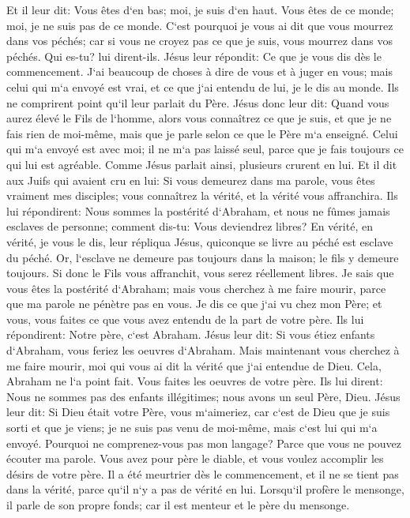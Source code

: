 \verse Et il leur dit: Vous êtes d`en bas; moi, je suis d`en haut. Vous êtes de ce monde; moi, je ne suis pas de ce monde. 
\verse C`est pourquoi je vous ai dit que vous mourrez dans vos péchés; car si vous ne croyez pas ce que je suis, vous mourrez dans vos péchés. 
\verse Qui es-tu? lui dirent-ils. Jésus leur répondit: Ce que je vous dis dès le commencement. 
\verse J`ai beaucoup de choses à dire de vous et à juger en vous; mais celui qui m`a envoyé est vrai, et ce que j`ai entendu de lui, je le dis au monde. 
\verse Ils ne comprirent point qu`il leur parlait du Père. 
\verse Jésus donc leur dit: Quand vous aurez élevé le Fils de l`homme, alors vous connaîtrez ce que je suis, et que je ne fais rien de moi-même, mais que je parle selon ce que le Père m`a enseigné. 
\verse Celui qui m`a envoyé est avec moi; il ne m`a pas laissé seul, parce que je fais toujours ce qui lui est agréable. 
\verse Comme Jésus parlait ainsi, plusieurs crurent en lui. 
\verse Et il dit aux Juifs qui avaient cru en lui: Si vous demeurez dans ma parole, vous êtes vraiment mes disciples; 
\verse vous connaîtrez la vérité, et la vérité vous affranchira. 
\verse Ils lui répondirent: Nous sommes la postérité d`Abraham, et nous ne fûmes jamais esclaves de personne; comment dis-tu: Vous deviendrez libres? 
\verse En vérité, en vérité, je vous le dis, leur répliqua Jésus, quiconque se livre au péché est esclave du péché. 
\verse Or, l`esclave ne demeure pas toujours dans la maison; le fils y demeure toujours. 
\verse Si donc le Fils vous affranchit, vous serez réellement libres. 
\verse Je sais que vous êtes la postérité d`Abraham; mais vous cherchez à me faire mourir, parce que ma parole ne pénètre pas en vous. 
\verse Je dis ce que j`ai vu chez mon Père; et vous, vous faites ce que vous avez entendu de la part de votre père. 
\verse Ils lui répondirent: Notre père, c`est Abraham. Jésus leur dit: Si vous étiez enfants d`Abraham, vous feriez les oeuvres d`Abraham. 
\verse Mais maintenant vous cherchez à me faire mourir, moi qui vous ai dit la vérité que j`ai entendue de Dieu. Cela, Abraham ne l`a point fait. 
\verse Vous faites les oeuvres de votre père. Ils lui dirent: Nous ne sommes pas des enfants illégitimes; nous avons un seul Père, Dieu. 
\verse Jésus leur dit: Si Dieu était votre Père, vous m`aimeriez, car c`est de Dieu que je suis sorti et que je viens; je ne suis pas venu de moi-même, mais c`est lui qui m`a envoyé. 
\verse Pourquoi ne comprenez-vous pas mon langage? Parce que vous ne pouvez écouter ma parole. 
\verse Vous avez pour père le diable, et vous voulez accomplir les désirs de votre père. Il a été meurtrier dès le commencement, et il ne se tient pas dans la vérité, parce qu`il n`y a pas de vérité en lui. Lorsqu`il profère le mensonge, il parle de son propre fonds; car il est menteur et le père du mensonge. 
